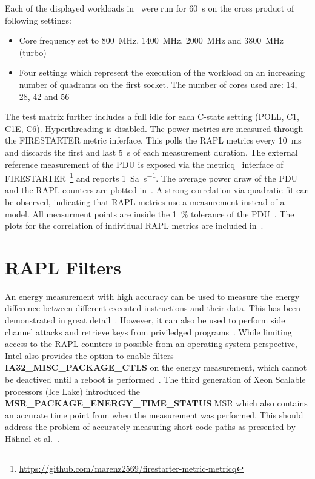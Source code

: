 Each of the displayed workloads in~ were run for \SI{60}{\second} on the cross product of following settings:
\begin{itemize}
    \item Core frequency set to \SI{800}{\MHz}, \SI{1400}{\MHz}, \SI{2000}{\MHz} and \SI{3800}{\MHz} (turbo)
    \item Four settings which represent the execution of the workload on an increasing number of quadrants on the first socket.
    The number of cores used are: \SI{14}{}, \SI{28}{}, \SI{42}{} and \SI{56}{}
\end{itemize}
The test matrix further includes a full idle for each C-state setting (POLL, C1, C1E, C6).
Hyperthreading is disabled.
The power metrics are measured through the FIRESTARTER metric inferface.
This polls the RAPL metrics every \SI{10}{\ms} and discards the first and last \SI{5}{\second} of each measurement duration.
The external reference measurement of the PDU is exposed via the metricq~\cite{Ilsche_2019_MetricQ} interface of FIRESTARTER~\footnote{\url{https://github.com/marenz2569/firestarter-metric-metricq}} and reports \SI{1}{Sa\per\second}.
The average power draw of the PDU and the RAPL counters are plotted in~.
A strong correlation via quadratic fit can be observed, indicating that RAPL metrics use a measurement instead of a model.
All measurment points are inside the \SI{1}{\percent} tolerance of the PDU~\cite{Raritan_PX2_5528}.
The plots for the correlation of individual RAPL metrics are included in~.

\section{RAPL Filters}
\label{sec:rapl_filters}

An energy measurement with high accuracy can be used to measure the energy difference between different executed instructions and their data.
This has been demonstrated in great detail~\cite{Lucas_2016_AluPower,Schoene_2024_Alder_Lake,Schoene_2021_Zen2}.
However, it can also be used to perform side channel attacks and retrieve keys from priviledged programs~\cite{Lipp_2021_Platypus}.
While limiting access to the RAPL counters is possible from an operating system perspective, Intel also provides the option to enable filters \textbf{IA32\_MISC\_PACKAGE\_CTLS} on the energy measurement, which cannot be deactived until a reboot is performed~\cite[Vol. 4 Table 2-52]{intel_combined_software_developer_manual}.
The third generation of Xeon Scalable processors (Ice Lake) introduced the \textbf{MSR\_PACKAGE\_ENERGY\_TIME\_STATUS} MSR which also contains an accurate time point from when the measurement was performed.
This should address the problem of accurately measuring short code-paths as presented by Hähnel et al.~\cite{Haehnel_2012_RAPL}.

